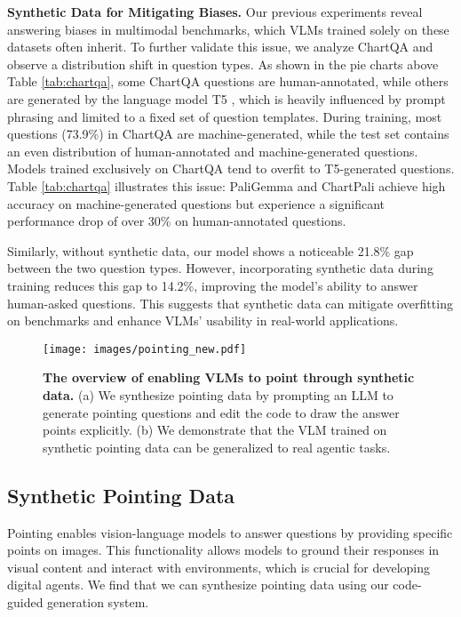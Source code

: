 
\smallbreak
\noindent \textbf{Synthetic Data for Mitigating Biases.} Our previous experiments reveal answering biases in multimodal benchmarks, which VLMs trained solely on these datasets often inherit. To further validate this issue, we analyze ChartQA and observe a distribution shift in question types. 
As shown in the pie charts above Table \ref{tab:chartqa}, some ChartQA questions are human-annotated, while others are generated by the language model T5 \citep{raffel2020exploring}, which is heavily influenced by prompt phrasing and limited to a fixed set of question templates.
During training, most questions (73.9\%) in ChartQA are machine-generated, while the test set contains an even distribution of human-annotated and machine-generated questions. Models trained exclusively on ChartQA tend to overfit to T5-generated questions. Table \ref{tab:chartqa} illustrates this issue: PaliGemma \citep{beyer2024paligemma} and ChartPali \citep{carbune2024chart} achieve high accuracy on machine-generated questions but experience a significant performance drop of over 30\% on human-annotated questions.

Similarly, without synthetic data, our model shows a noticeable 21.8\% gap between the two question types. 
However, incorporating synthetic data during training reduces this gap to 14.2\%, improving the model’s ability to answer human-asked questions. This suggests that synthetic data can mitigate overfitting on benchmarks and enhance VLMs' usability in real-world applications.

\begin{figure*}[!t]
    \centering
    \texttt{[image: images/pointing\_new.pdf]}
    \vspace{-.6cm}
    \caption{\textbf{The overview of enabling VLMs to point through synthetic data.} (a) We synthesize pointing data by prompting an LLM to generate pointing questions and edit the code to draw the answer points explicitly. (b) We demonstrate that the VLM trained on synthetic pointing data can be generalized to real agentic tasks.}
    \label{fig: pointing}
    \vspace{-.1cm}
\end{figure*}

\subsection{Synthetic Pointing Data} \label{sec: pointing}
Pointing enables vision-language models to answer questions by providing specific points on images. 
This functionality allows models to ground their responses in visual content and interact with environments, which is crucial for developing digital agents.
We find that we can synthesize pointing data using our code-guided generation system.

